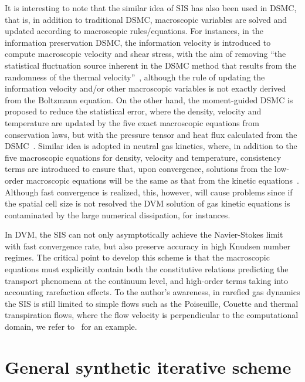 It is interesting to note that the similar idea of SIS has also been used in DSMC, that is, in addition to traditional DSMC, macroscopic variables are solved and updated according to macroscopic rules/equations. For instances, in the information preservation DSMC, the information velocity is introduced to compute macroscopic velocity and shear stress, with the aim of removing ``the statistical fluctuation source inherent in the DSMC method that results from the randomness of the thermal velocity''~\cite{Fan2001,ZhangJun2011JCP,Fei2013}, although the rule of updating the information velocity and/or other macroscopic variables is not exactly derived from the Boltzmann equation. On the other hand, the moment-guided DSMC is proposed to reduce the statistical error, where the density, velocity and temperature are updated by the five exact macroscopic equations from conservation laws, but with the pressure tensor and heat flux calculated from the DSMC~\cite{Degond2011}. Similar idea is adopted in neutral gas kinetics, where, in addition to the five macroscopic equations for density, velocity and temperature, consistency terms are introduced to ensure that, upon convergence, solutions from the low-order macroscopic equations will be the same as that from the kinetic equations~\cite{Taitano2014}. Although fast convergence is realized, this, however, will cause problems since if the spatial cell size is not resolved the DVM solution of gas kinetic equations is contaminated by the large numerical dissipation, for instances. 


In DVM, the SIS can not only asymptotically achieve the Navier-Stokes limit with fast convergence rate, but also preserve accuracy in high Knudsen number regimes. The critical point to develop this scheme is that the macroscopic equations must explicitly contain both the constitutive relations predicting the transport phenomena at the continuum level, and high-order terms taking into accounting rarefaction effects. To the author's awareness, in rarefied gas dynamics the SIS is still limited to simple flows such as the Poiseuille, Couette and thermal transpiration flows, where the flow velocity is perpendicular to the computational domain, we refer to~\cite{Valougeorgis:2003zr} for an example.




\section{General synthetic iterative scheme}\label{secIII}

